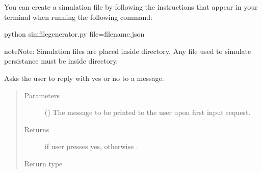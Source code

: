 \documentclass[letterpaper,10pt,english]{sphinxmanual}
\begin{document}
You can create a simulation file by following the instructions that
appear in your terminal when running the following command:

\begin{sphinxVerbatim}[commandchars=\\\{\}]
\PYGZdl{} python simfile\PYGZus{}generator.py \PYGZhy{}\PYGZhy{}file=filename.json
\end{sphinxVerbatim}

\begin{sphinxadmonition}{note}{Note:}
Simulation files are placed inside
{\hyperref[\detokenize{app:app.environment_settings.SIMULATION_ROOT}]{}} directory. Any file
used to simulate persistance must be inside
{\hyperref[\detokenize{app:app.environment_settings.SHARED_ROOT}]{}} directory.
\end{sphinxadmonition}

\begin{fulllineitems}
\label{\detokenize{app:app.simfile_generator._in_yes_no}}
Asks the user to reply with yes or no to a message.
\begin{quote}\begin{description}
\item[{Parameters}] \leavevmode
{} () \textendash{} The message to be printed to the user upon first input request.

\item[{Returns}] \leavevmode
{} if user presses yes, otherwise .

\item[{Return type}] \leavevmode
{}

\end{description}\end{quote}

\end{fulllineitems}

\end{document}
